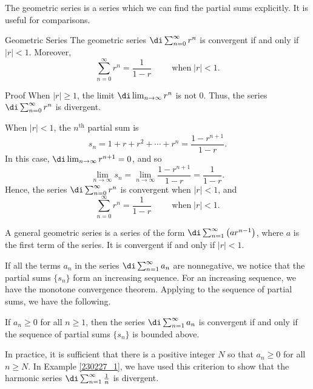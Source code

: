 The geometric series is a series which we can find the partial sums explicitly. It is   useful for comparisons.
\begin{theorem}[label=230227_2]{Geometric Series}
The geometric series $\di\sum_{n=0}^{\infty}r^n$ is convergent if and only if $|r|<1$. Moreover,
\[\sum_{n=0}^{\infty}r^n=\frac{1}{1-r}\hspace{1cm}\text{when}\;|r|<1.\]
\end{theorem}
\begin{myproof}{Proof}
When $|r|\geq 1$, the limit $\di\lim_{n\to\infty}r^n$ is not 0. Thus, the series $\di\sum_{n=0}^{\infty}r^n$ is divergent. 

When $|r|<1$, the $n^{\text{th}}$ partial sum is 
\[s_n=1+r+r^2+\cdots+r^n=\frac{1-r^{n+1}}{1-r}.\]
In this case,
$\di \lim_{n\to \infty}r^{n+1}=0$, and so
\[\lim_{n\to\infty}s_n=\lim_{n\to\infty} \frac{1-r^{n+1}}{1-r}=\frac{1}{1-r}.\]
Hence, the series $\di\sum_{n=0}^{\infty}r^n$ is convergent when $|r|<1$, and 
\[\sum_{n=0}^{\infty}r^n=\frac{1}{1-r}\hspace{1cm}\text{when}\;|r|<1.\]
\end{myproof}

\begin{highlight}{}
A general geometric series is a series of the form $\di \sum_{n=1}^{\infty} \left(ar^{n-1}\right)$, where $a$ is the first term of the series. It is convergent if and only if $|r|<1$. 
\end{highlight}

If all the terms $a_n$ in the series $\di \sum_{n=1}^{\infty}a_n$ are nonnegative, we notice that the partial sums $\{s_n\}$ form an increasing sequence. For an increasing sequence, we have the monotone convergence theorem. Applying to the sequence of partial sums, we have the following.
\begin{theorem}[label=230227_3]{}
If $a_n\geq 0$ for all $n\geq 1$, then the series $\di \sum_{n=1}^{\infty}a_n$ is convergent if and only if the sequence of partial sums $\{s_n\}$ is bounded above.
\end{theorem} 
In practice, it is sufficient that there is a positive integer $N$ so that $a_n\geq 0$ for all $n\geq N$.
In Example \ref{230227_1}, we have used this criterion to show that the harmonic series $\di\sum_{n=1}^{\infty}\frac{1}{n}$ is divergent. 


